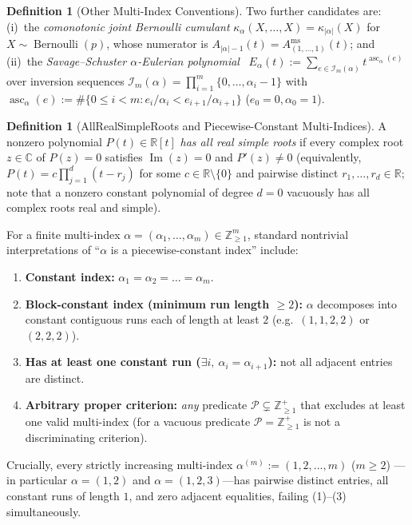 \documentclass[11pt]{article}
\theoremstyle{definition}
\newtheorem{definition}[theorem]{Definition}
\newcommand{\RR}{\mathbb{R}}
\newcommand{\CC}{\mathbb{C}}
\newcommand{\ZZ}{\mathbb{Z}}
\newcommand{\asc}{\operatorname{asc}}
\newcommand{\Bern}{\operatorname{Bernoulli}}
\begin{document}
\begin{definition}[Other Multi-Index Conventions]\label{def:other-conventions}
Two further candidates are: (i)~the \emph{comonotonic joint Bernoulli cumulant}
$\kappa_\alpha(X,\dots,X) = \kappa_{|\alpha|}(X)$ for $X \sim \Bern(p)$, whose numerator is
$A_{|\alpha|-1}(t) = A_{(1,\dots,1)}^{\mathrm{ms}}(t)$; and (ii)~the \emph{Savage--Schuster
$\alpha$-Eulerian polynomial}~\cite{SavageSchuster2012,SavageVisontai2015}
$E_\alpha(t) := \sum_{e \in \mathcal{I}_m(\alpha)} t^{\asc_\alpha(e)}$ over inversion
sequences $\mathcal{I}_m(\alpha) = \prod_{i=1}^m \{0,\dots,\alpha_i-1\}$ with
$\asc_\alpha(e) := \#\{0 \le i < m : e_i/\alpha_i < e_{i+1}/\alpha_{i+1}\}$ ($e_0=0,\alpha_0=1$).
\end{definition}

\begin{definition}[AllRealSimpleRoots and Piecewise-Constant Multi-Indices]\label{def:predicates}
A nonzero polynomial $P(t) \in \RR[t]$ \emph{has all real simple roots} if every complex
root $z \in \CC$ of $P(z)=0$ satisfies $\operatorname{Im}(z)=0$ and $P'(z)\neq 0$
(equivalently, $P(t) = c \prod_{j=1}^d (t - r_j)$ for some $c \in \RR \setminus \{0\}$ and
pairwise distinct $r_1,\dots,r_d \in \RR$; note that a nonzero constant polynomial of degree
$d=0$ vacuously has all complex roots real and simple).

For a finite multi-index $\alpha = (\alpha_1,\dots,\alpha_m) \in \ZZ_{\ge 1}^m$, standard
nontrivial interpretations of ``$\alpha$ is a piecewise-constant index'' include:
\begin{enumerate}
  \item \textbf{Constant index:} $\alpha_1 = \alpha_2 = \dots = \alpha_m$.
  \item \textbf{Block-constant index (minimum run length $\ge 2$):} $\alpha$ decomposes into
  constant contiguous runs each of length at least $2$ (e.g.\ $(1,1,2,2)$ or $(2,2,2)$).
  \item \textbf{Has at least one constant run ($\exists i,\ \alpha_i = \alpha_{i+1}$):}
  not all adjacent entries are distinct.
  \item \textbf{Arbitrary proper criterion:} \emph{any} predicate $\mathcal{P} \subsetneq
  \ZZ_{\ge 1}^+$ that excludes at least one valid multi-index (for a vacuous predicate
  $\mathcal{P} = \ZZ_{\ge 1}^+$ is not a discriminating criterion).
\end{enumerate}
Crucially, every strictly increasing multi-index $\alpha^{(m)} := (1,2,\dots,m)$ ($m \ge 2$)
---in particular $\alpha=(1,2)$ and $\alpha=(1,2,3)$---has pairwise distinct entries, all
constant runs of length $1$, and zero adjacent equalities, failing (1)--(3) simultaneously.
\end{definition}
\end{document}
